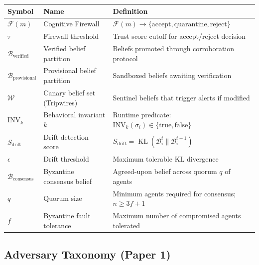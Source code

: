 \documentclass[
]{article}
\newcounter{none} %
\DeclareMathOperator{\KL}{KL}
\begin{document}
{\def\LTcaptype{none} %
\begin{longtable}[]{@{}
  >{\raggedright\arraybackslash}p{}
  >{\raggedright\arraybackslash}p{}
  >{\raggedright\arraybackslash}p{}@{}}
\toprule\noalign{}
\begin{minipage}[b]{\linewidth}\raggedright
Symbol
\end{minipage} & \begin{minipage}[b]{\linewidth}\raggedright
Name
\end{minipage} & \begin{minipage}[b]{\linewidth}\raggedright
Definition
\end{minipage} \\
\midrule\noalign{}
\endhead
\bottomrule\noalign{}
\endlastfoot
\(\mathcal{F}(m)\) & Cognitive Firewall &
\(\mathcal{F}(m) \to \{\text{accept}, \text{quarantine}, \text{reject}\}\) \\
\(\tau\) & Firewall threshold & Trust score cutoff for accept/reject
decision \\
\(\mathcal{B}_{\text{verified}}\) & Verified belief partition & Beliefs
promoted through corroboration protocol \\
\(\mathcal{B}_{\text{provisional}}\) & Provisional belief partition &
Sandboxed beliefs awaiting verification \\
\(\mathcal{W}\) & Canary belief set (Tripwires) & Sentinel beliefs that
trigger alerts if modified \\
\(\text{INV}_k\) & Behavioral invariant \(k\) & Runtime predicate:
\(\text{INV}_k(\sigma_i) \in \{\text{true}, \text{false}\}\) \\
\(S_{\text{drift}}\) & Drift detection score &
\(S_{\text{drift}} = \KL(\mathcal{B}_i^t \| \mathcal{B}_i^{t-1})\) \\
\(\epsilon\) & Drift threshold & Maximum tolerable KL divergence \\
\(\mathcal{B}_{\text{consensus}}\) & Byzantine consensus belief &
Agreed-upon belief across quorum \(q\) of agents \\
\(q\) & Quorum size & Minimum agents required for consensus;
\(n \geq 3f+1\) \\
\(f\) & Byzantine fault tolerance & Maximum number of compromised agents
tolerated \\
\end{longtable}
}

\subsection{Adversary Taxonomy (Paper
1)}\label{adversary-taxonomy-paper-1}
\end{document}
